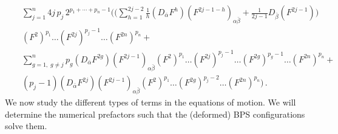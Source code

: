 \documentclass[a4paper,12pt,oneside]{article}
\begin{document}
\begin{eqnarray}
\label{gentermexp}
&&\sum_{j=1}^{n} 4 j \, p_j \, 2^{p_1+\cdots+p_n-1}
 \Biggl( \biggr(\sum_{h=1}^{2j-2} \frac{1}{h}
\left( D_{\bar{\alpha}} F^{h} \right)(F^{2j-1-h})_{\alpha\bar{\beta}} 
 + \frac{1}{2j-1}  
 D_{\bar\beta}(F^{2j-1})\biggr) \nonumber\\
 &&
(F^2)^{p_1}  \ldots (F^{2j})^{p_j-1} \ldots (F^{2n})^{p_n} + 
\nonumber\\
&& \sum_{g=1, \; g \neq j}^n p_g \left(D_{\bar{\alpha}} F^{2g}\right)
\left(F^{2j-1}\right)_{\alpha\bar{\beta}} (F^2)^{p_1} \ldots (F^{2j})^{p_j-1} \ldots
(F^{2g})^{p_g-1}\ldots (F^{2n})^{p_n}+  \nonumber\\
&& (p_j -1) \left(D_{\bar{\alpha}} F^{2j}\right)
\left(F^{2j-1}\right)_{\alpha\bar{\beta}} (F^2)^{p_1} \ldots (F^{2g})^{p_j-2} 
\ldots (F^{2n})^{p_n}  \Biggr)\, .
\end{eqnarray}
We now study the different types of terms in the equations of motion. We will determine
the numerical prefactors such that the (deformed) BPS configurations solve them.
\end{document}
